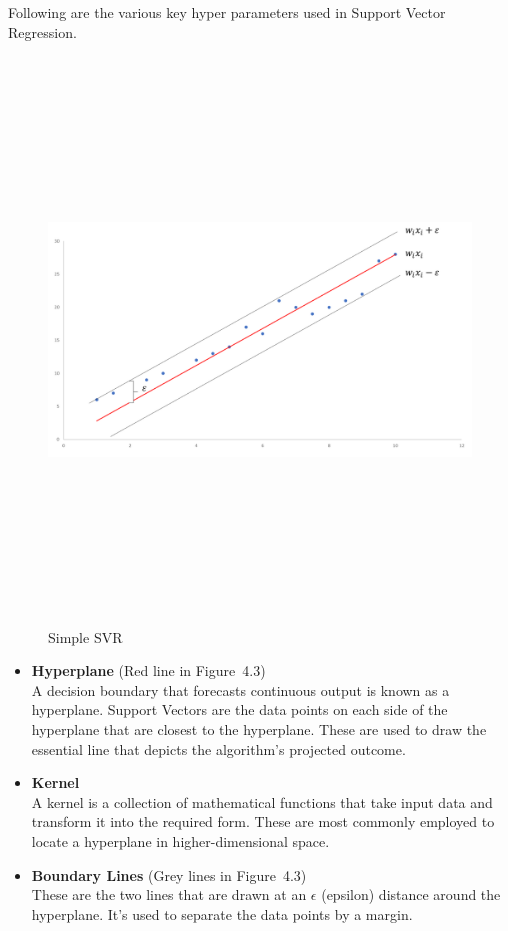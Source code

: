 Following are the various key hyper parameters used in Support Vector Regression.
\begin{figure}[h]
\centering
\includegraphics[width=1\textwidth, height=15cm]{./figures/svm.png}
\caption{Simple SVR}
\label{fig1}
\end{figure}

\begin{itemize}
\item \textbf{Hyperplane} (Red line in Figure~4.3) \\ A decision boundary that forecasts continuous output is known as a hyperplane. Support Vectors are the data points on each side of the hyperplane that are closest to the hyperplane. These are used to draw the essential line that depicts the algorithm's projected outcome.
\item \textbf{Kernel} \\ A kernel is a collection of mathematical functions that take input data and transform it into the required form. These are most commonly employed to locate a hyperplane in higher-dimensional space.
\item \textbf{Boundary Lines} (Grey lines in Figure~4.3) \\ 
These are the two lines that are drawn at an \textbf{$\epsilon$} (epsilon) distance around the hyperplane. It's used to separate the data points by a margin.

\end{itemize}

